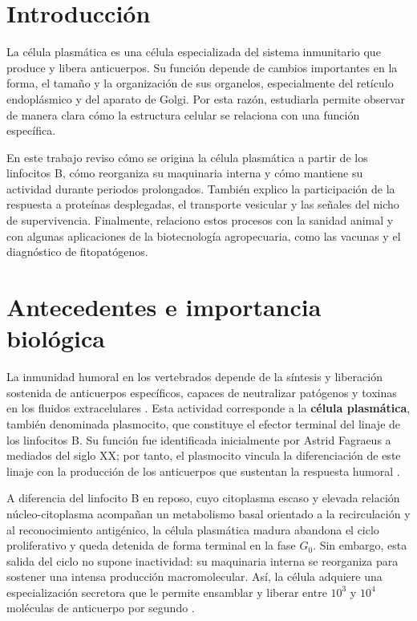 \section{Introducción}

La célula plasmática es una célula especializada del sistema inmunitario que produce y libera anticuerpos. Su función depende de cambios importantes en la forma, el tamaño y la organización de sus organelos, especialmente del retículo endoplásmico y del aparato de Golgi. Por esta razón, estudiarla permite observar de manera clara cómo la estructura celular se relaciona con una función específica.

En este trabajo reviso cómo se origina la célula plasmática a partir de los linfocitos B, cómo reorganiza su maquinaria interna y cómo mantiene su actividad durante periodos prolongados. También explico la participación de la respuesta a proteínas desplegadas, el transporte vesicular y las señales del nicho de supervivencia. Finalmente, relaciono estos procesos con la sanidad animal y con algunas aplicaciones de la biotecnología agropecuaria, como las vacunas y el diagnóstico de fitopatógenos.

\section{Antecedentes e importancia biológica}


La inmunidad humoral en los vertebrados depende de la síntesis y liberación sostenida de anticuerpos específicos, capaces de neutralizar patógenos y toxinas en los fluidos extracelulares \parencite{alberts2022molecular,abbas2022cellular}. Esta actividad corresponde a la \textbf{célula plasmática}, también denominada plasmocito, que constituye el efector terminal del linaje de los linfocitos B. Su función fue identificada inicialmente por Astrid Fagraeus a mediados del siglo XX; por tanto, el plasmocito vincula la diferenciación de este linaje con la producción de los anticuerpos que sustentan la respuesta humoral \parencite{nutt2015generation}.



A diferencia del linfocito B en reposo, cuyo citoplasma escaso y elevada relación núcleo-citoplasma acompañan un metabolismo basal orientado a la recirculación y al reconocimiento antigénico, la célula plasmática madura abandona el ciclo proliferativo y queda detenida de forma terminal en la fase $G_0$. Sin embargo, esta salida del ciclo no supone inactividad: su maquinaria interna se reorganiza para sostener una intensa producción macromolecular. Así, la célula adquiere una especialización secretora que le permite ensamblar y liberar entre $10^3$ y $10^4$ moléculas de anticuerpo por segundo \parencite{cenci2008progressive,shapiroshelef2005regulation}.



